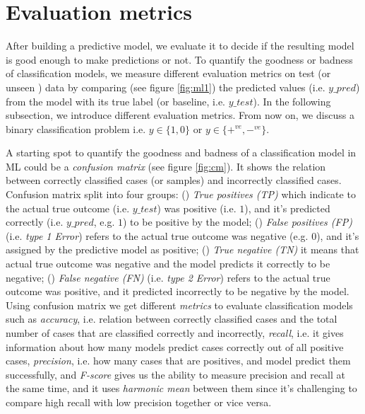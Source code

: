 \section{Evaluation metrics}\label{auc}
After building a predictive model, we evaluate it to decide if the resulting model is good enough to make predictions or not. To quantify the goodness or badness of classification models, we measure different evaluation metrics on test (or unseen ) data by comparing (see figure \ref{fig:ml1}) the predicted values (i.e. $y\_pred$) from the model with its true label (or baseline, i.e. $y\_test$). In the following subsection, we introduce different evaluation metrics. From now on, we discuss a binary classification problem i.e. $y \in \{1,0\}$ or $y \in \{+^{ve}, -^{ve}\}$.

A starting spot to quantify the goodness and badness of a classification model in ML could be a \textit{confusion matrix} (see figure \ref{fig:cm}). It shows the relation between correctly classified cases (or samples) and incorrectly classified cases. Confusion matrix split into four groups: () \textit{True positives (TP)} which indicate to the actual true outcome (i.e. $y\_test$) was positive (i.e. $1$), and it’s predicted correctly (i.e. $y\_pred$, e.g. $1$) to be positive by the model; () \textit{False positives (FP)} (i.e. \textit{type 1 Error}) refers to the actual true outcome was negative (e.g. $0$), and it’s assigned by the predictive model as positive; () \textit{True negative (TN)} it means that actual true outcome was negative and the model predicts it correctly to be negative; () \textit{False negative (FN)} (i.e. \textit{type 2 Error}) refers to the actual true outcome was positive, and it predicted incorrectly to be negative by the model. Using confusion matrix we get different \textit{metrics} to evaluate classification models such as \textit{accuracy}, i.e. relation between correctly classified cases and the total number of cases that are classified correctly and incorrectly, \textit{recall}, i.e. it gives information about how many models predict cases correctly out of all positive cases, \textit{precision}, i.e. how many cases that are positives, and model predict them successfully, and \textit{F-score} gives us the ability to measure precision and recall at the same time, and it uses \textit{harmonic mean} between them since it’s challenging to compare high recall with low precision together or vice versa.

